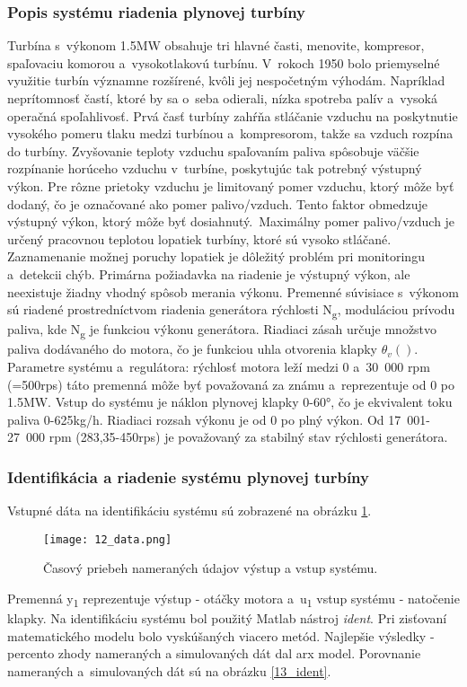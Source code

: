 \subsubsection{Popis systému riadenia plynovej turbíny}
Turbína s~výkonom 1.5MW obsahuje tri hlavné časti, menovite, kompresor,
spaľovaciu komorou a~vysokotlakovú turbínu. V~rokoch 1950 bolo
priemyselné využitie turbín významne rozšírené, kvôli jej nespočetným
výhodám. Napríklad neprítomnosť častí, ktoré by sa o~seba odierali,
nízka spotreba palív a~vysoká operačná spoľahlivosť. Prvá časť turbíny
zahŕňa stláčanie vzduchu na poskytnutie vysokého pomeru tlaku medzi
turbínou a~kompresorom, takže sa vzduch rozpína do turbíny. Zvyšovanie
teploty vzduchu spaľovaním paliva spôsobuje väčšie rozpínanie horúceho
vzduchu v~turbíne, poskytujúc tak potrebný výstupný výkon. Pre rôzne
prietoky vzduchu je limitovaný pomer vzduchu, ktorý môže byť dodaný, čo
je označované ako pomer palivo/vzduch. Tento faktor obmedzuje výstupný
výkon, ktorý môže byť dosiahnutý.~Maximálny pomer palivo/vzduch je
určený pracovnou teplotou lopatiek turbíny, ktoré sú vysoko stláčané.
Zaznamenanie možnej poruchy lopatiek je dôležitý problém pri monitoringu
a~detekcii chýb. Primárna požiadavka na riadenie je výstupný výkon, ale
neexistuje žiadny vhodný spôsob merania výkonu. Premenné súvisiace
s~výkonom sú riadené prostredníctvom riadenia generátora rýchlosti
N\textsubscript{g}, moduláciou prívodu paliva, kde N\textsubscript{g} je
funkciou výkonu generátora. Riadiaci zásah určuje množstvo paliva
dodávaného do motora, čo je funkciou uhla otvorenia klapky
\(\theta_{v}\left( \right).\) Parametre systému a~regulátora: rýchlosť
motora leží medzi 0 a~30~000 rpm (=500rps) táto premenná môže byť
považovaná za známu a~reprezentuje od 0 po 1.5MW. Vstup do systému je
náklon plynovej klapky 0-60°, čo je ekvivalent toku paliva 0-625kg/h.
Riadiaci rozsah výkonu je od 0 po plný výkon. Od 17~001-27~000 rpm
(283,35-450rps) je považovaný za stabilný stav rýchlosti generátora.\cite{MPC07}
\subsubsection{Identifikácia a riadenie systému plynovej turbíny}
Vstupné dáta na identifikáciu systému sú zobrazené na obrázku  \ref{12_data}. 

\begin{figure}[h]
\centering
\texttt{[image: 12\_data.png]}
\caption{Časový priebeh nameraných údajov výstup a vstup systému.}
\label{12_data}
\end{figure}
Premenná y\textsubscript{1} reprezentuje výstup - otáčky motora a~u\textsubscript{1}
vstup systému - natočenie klapky. Na identifikáciu systému bol použitý Matlab nástroj \textit{ident}. Pri zisťovaní matematického modelu bolo vyskúšaných viacero metód. Najlepšie
výsledky - percento zhody nameraných a simulovaných dát dal arx model. Porovnanie nameraných a~simulovaných dát sú na
obrázku \ref{13_ident}.


